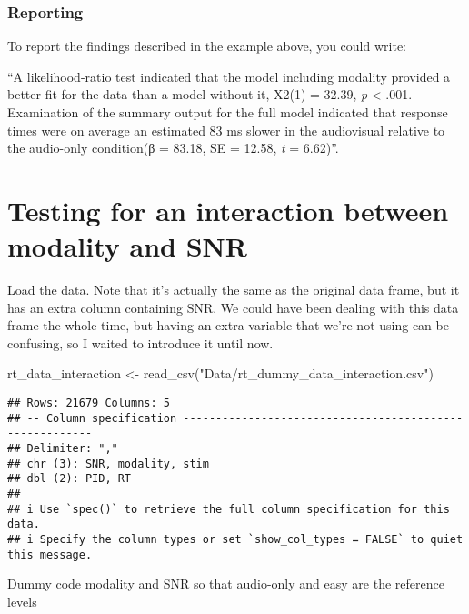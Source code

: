 \documentclass[
]{article}
\newenvironment{Shaded}{\begin{snugshade}}{\end{snugshade}}
\newcommand{\FunctionTok}[1]{\textcolor[rgb]{0.00,0.00,0.00}{#1}}
\newcommand{\NormalTok}[1]{#1}
\newcommand{\OtherTok}[1]{\textcolor[rgb]{0.56,0.35,0.01}{#1}}
\newcommand{\StringTok}[1]{\textcolor[rgb]{0.31,0.60,0.02}{#1}}
\begin{document}
\hypertarget{reporting}{%
\subsubsection{Reporting}\label{reporting}}

To report the findings described in the example above, you could write:

``A likelihood-ratio test indicated that the model including modality
provided a better fit for the data than a model without it, X2(1) =
32.39, \emph{p} \textless{} .001. Examination of the summary output for
the full model indicated that response times were on average an
estimated 83 ms slower in the audiovisual relative to the audio-only
condition(β = 83.18, SE = 12.58, \emph{t} = 6.62)''.

\hypertarget{testing-for-an-interaction-between-modality-and-snr}{%
\section{Testing for an interaction between modality and
SNR}\label{testing-for-an-interaction-between-modality-and-snr}}

Load the data. Note that it's actually the same as the original data
frame, but it has an extra column containing SNR. We could have been
dealing with this data frame the whole time, but having an extra
variable that we're not using can be confusing, so I waited to introduce
it until now.

\begin{Shaded}
\begin{Highlighting}[]
\NormalTok{rt\_data\_interaction }\OtherTok{\textless{}{-}} \FunctionTok{read\_csv}\NormalTok{(}\StringTok{"Data/rt\_dummy\_data\_interaction.csv"}\NormalTok{)}
\end{Highlighting}
\end{Shaded}

\begin{verbatim}
## Rows: 21679 Columns: 5
## -- Column specification --------------------------------------------------------
## Delimiter: ","
## chr (3): SNR, modality, stim
## dbl (2): PID, RT
## 
## i Use `spec()` to retrieve the full column specification for this data.
## i Specify the column types or set `show_col_types = FALSE` to quiet this message.
\end{verbatim}

Dummy code modality and SNR so that audio-only and easy are the
reference levels
\end{document}
